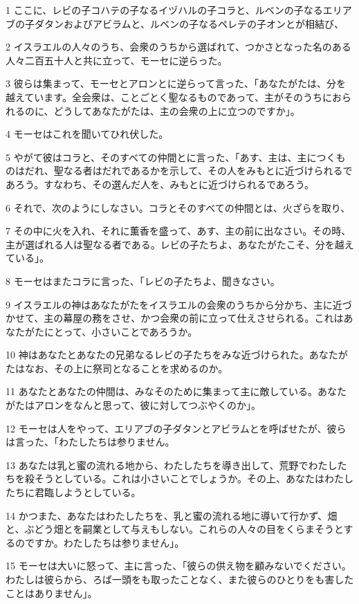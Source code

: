 \par 1 ここに、レビの子コハテの子なるイヅハルの子コラと、ルベンの子なるエリアブの子ダタンおよびアビラムと、ルベンの子なるペレテの子オンとが相結び、
\par 2 イスラエルの人々のうち、会衆のうちから選ばれて、つかさとなった名のある人々二百五十人と共に立って、モーセに逆らった。
\par 3 彼らは集まって、モーセとアロンとに逆らって言った、「あなたがたは、分を越えています。全会衆は、ことごとく聖なるものであって、主がそのうちにおられるのに、どうしてあなたがたは、主の会衆の上に立つのですか」。
\par 4 モーセはこれを聞いてひれ伏した。
\par 5 やがて彼はコラと、そのすべての仲間とに言った、「あす、主は、主につくものはだれ、聖なる者はだれであるかを示して、その人をみもとに近づけられるであろう。すなわち、その選んだ人を、みもとに近づけられるであろう。
\par 6 それで、次のようにしなさい。コラとそのすべての仲間とは、火ざらを取り、
\par 7 その中に火を入れ、それに薫香を盛って、あす、主の前に出なさい。その時、主が選ばれる人は聖なる者である。レビの子たちよ、あなたがたこそ、分を越えている」。
\par 8 モーセはまたコラに言った、「レビの子たちよ、聞きなさい。
\par 9 イスラエルの神はあなたがたをイスラエルの会衆のうちから分かち、主に近づかせて、主の幕屋の務をさせ、かつ会衆の前に立って仕えさせられる。これはあなたがたにとって、小さいことであろうか。
\par 10 神はあなたとあなたの兄弟なるレビの子たちをみな近づけられた。あなたがたはなお、その上に祭司となることを求めるのか。
\par 11 あなたとあなたの仲間は、みなそのために集まって主に敵している。あなたがたはアロンをなんと思って、彼に対してつぶやくのか」。
\par 12 モーセは人をやって、エリアブの子ダタンとアビラムとを呼ばせたが、彼らは言った、「わたしたちは参りません。
\par 13 あなたは乳と蜜の流れる地から、わたしたちを導き出して、荒野でわたしたちを殺そうとしている。これは小さいことでしょうか。その上、あなたはわたしたちに君臨しようとしている。
\par 14 かつまた、あなたはわたしたちを、乳と蜜の流れる地に導いて行かず、畑と、ぶどう畑とを嗣業として与えもしない。これらの人々の目をくらまそうとするのですか。わたしたちは参りません」。
\par 15 モーセは大いに怒って、主に言った、「彼らの供え物を顧みないでください。わたしは彼らから、ろば一頭をも取ったことなく、また彼らのひとりをも害したことはありません」。
